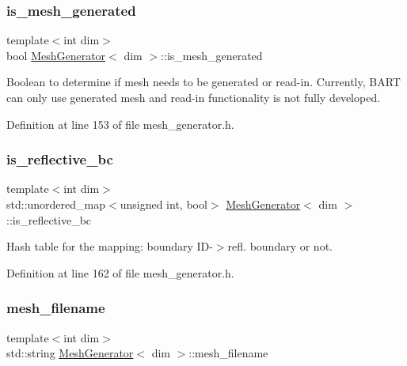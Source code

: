 \subsubsection{\texorpdfstring{is\+\_\+mesh\+\_\+generated}{is\_mesh\_generated}}
{\footnotesize\ttfamily template$<$int dim$>$ \\
bool \hyperlink{class_mesh_generator}{Mesh\+Generator}$<$ dim $>$\+::is\+\_\+mesh\+\_\+generated\hspace{0.3cm}{\ttfamily [private]}}

Boolean to determine if mesh needs to be generated or read-\/in. Currently, B\+A\+RT can only use generated mesh and read-\/in functionality is not fully developed. 

Definition at line 153 of file mesh\+\_\+generator.\+h.

\mbox{\label{class_mesh_generator_a5a6820b74d7cef07596e1d28a8bad8aa}} 
\subsubsection{\texorpdfstring{is\+\_\+reflective\+\_\+bc}{is\_reflective\_bc}}
{\footnotesize\ttfamily template$<$int dim$>$ \\
std\+::unordered\+\_\+map$<$unsigned int, bool$>$ \hyperlink{class_mesh_generator}{Mesh\+Generator}$<$ dim $>$\+::is\+\_\+reflective\+\_\+bc\hspace{0.3cm}{\ttfamily [private]}}



Hash table for the mapping\+: boundary I\+D-\/$>$refl. boundary or not. 



Definition at line 162 of file mesh\+\_\+generator.\+h.

\mbox{\label{class_mesh_generator_a1b283d2ba59b1719cab8dd191e72508a}} 
\subsubsection{\texorpdfstring{mesh\+\_\+filename}{mesh\_filename}}
{\footnotesize\ttfamily template$<$int dim$>$ \\
std\+::string \hyperlink{class_mesh_generator}{Mesh\+Generator}$<$ dim $>$\+::mesh\+\_\+filename\hspace{0.3cm}{\ttfamily [private]}}



